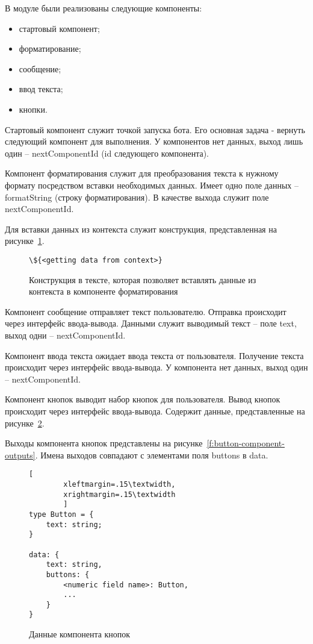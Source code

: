 В модуле были реализованы следующие компоненты:
\begin{itemize}
	\item стартовый компонент;
	\item форматирование;
	\item сообщение;
	\item ввод текста;
	\item кнопки.
\end{itemize}


Стартовый компонент служит точкой запуска бота. Его основная задача
- вернуть следующий компонент для выполнения. У компонентов нет данных,
выход лишь один – nextComponentId (id следующего компонента).

Компонент форматирования служит для преобразования текста к
нужному формату посредством вставки необходимых данных. Имеет одно
поле данных – formatString (строку форматирования). В качестве выхода
служит поле nextComponentId.

Для вставки данных из контекста служит
конструкция, представленная на рисунке~\ref{f:format-construct}.


\begin{figure}[ht]
	\centering
	\vspace{\toppaddingoffigure}
	\begin{lstlisting}
\${<getting data from context>}
    \end{lstlisting}
	\caption{Конструкция в тексте, которая позволяет вставлять данные из
		контекста в компоненте форматирования}
	\label{f:format-construct}
\end{figure}


Компонент сообщение отправляет текст пользователю. Отправка
происходит через интерфейс ввода-вывода. Данными служит выводимый
текст – поле text, выход одни – nextComponentId.

Компонент ввода текста ожидает ввода текста от пользователя.
Получение текста происходит через интерфейс ввода-вывода. У компонента
нет данных, выход один – nextComponentId.

Компонент кнопок выводит набор кнопок для пользователя. Вывод
кнопок происходит через интерфейс ввода-вывода.
Содержит данные, представленные на рисунке~\ref{f:button-component-data}.

Выходы компонента кнопок представлены на рисунке~\ref{f:button-component-outputs}.
Имена выходов совпадают с элементами поля buttons в data.

\begin{figure}[ht]
	\centering
	\vspace{\toppaddingoffigure}
	\begin{lstlisting}[
        xleftmargin=.15\textwidth,
        xrightmargin=.15\textwidth
        ]
type Button = {
    text: string;
}

data: {
    text: string,
    buttons: {
        <numeric field name>: Button,
        ...
    }
}
    \end{lstlisting}
	\caption{Данные компонента кнопок}
	\label{f:button-component-data}
\end{figure}


